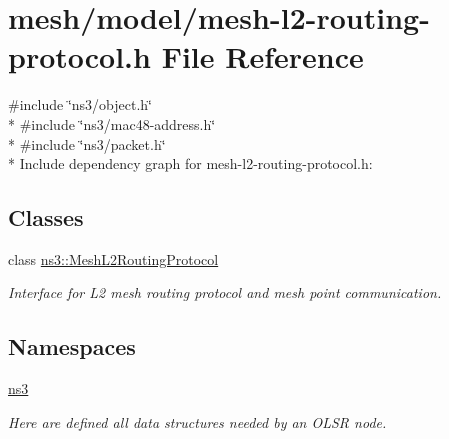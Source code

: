 \hypertarget{mesh-l2-routing-protocol_8h}{}\section{mesh/model/mesh-\/l2-\/routing-\/protocol.h File Reference}
\label{mesh-l2-routing-protocol_8h}
{\ttfamily \#include \char`\"{}ns3/object.\+h\char`\"{}}\\*
{\ttfamily \#include \char`\"{}ns3/mac48-\/address.\+h\char`\"{}}\\*
{\ttfamily \#include \char`\"{}ns3/packet.\+h\char`\"{}}\\*
Include dependency graph for mesh-\/l2-\/routing-\/protocol.h\+:
\subsection*{Classes}
\begin{DoxyCompactItemize}
\item 
class \hyperlink{classns3_1_1MeshL2RoutingProtocol}{ns3\+::\+Mesh\+L2\+Routing\+Protocol}
\begin{DoxyCompactList}\small\item\em Interface for L2 mesh routing protocol and mesh point communication. \end{DoxyCompactList}\end{DoxyCompactItemize}
\subsection*{Namespaces}
\begin{DoxyCompactItemize}
\item 
 \hyperlink{namespacens3}{ns3}
\begin{DoxyCompactList}\small\item\em Here are defined all data structures needed by an O\+L\+SR node. \end{DoxyCompactList}\end{DoxyCompactItemize}
